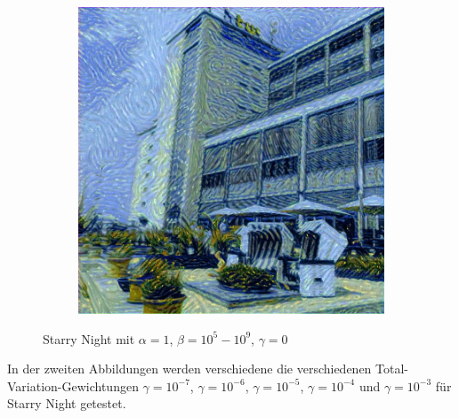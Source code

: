 \begin{figure}[H]
\begin{subfigure}[h]{0.15\textwidth}
    \end{subfigure}
    \begin{subfigure}[h]{0.15\textwidth}
        \centering
        \includegraphics[width=\textwidth]{resources/content/experiments/a__starry_night__768x768__style-weight_1e+09__tv-weight_0e+00.jpg}
    \end{subfigure}
    \caption{Starry Night mit $ \alpha = 1 $, $ \beta = 10^{5} - 10^{9} $, $ \gamma = 0 $}
\end{figure}

In der zweiten Abbildungen werden verschiedene die verschiedenen Total-Variation-Gewichtungen $ \gamma = 10^{-7} $, $ \gamma = 10^{-6} $, $ \gamma = 10^{-5} $, $ \gamma = 10^{-4} $ und $ \gamma = 10^{-3} $  für Starry Night getestet.

